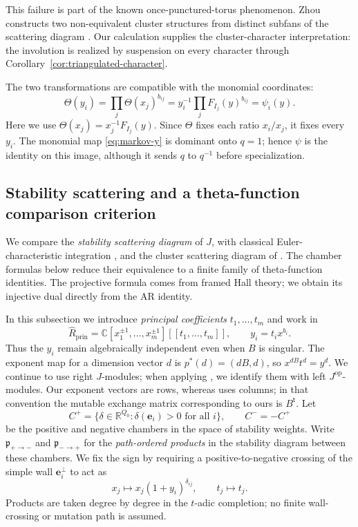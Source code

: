 \documentclass[11pt]{amsart}
\numberwithin{equation}{section}
\theoremstyle{definition}
\theoremstyle{remark}
\newcommand{\kk}{\mathbb C}
\newcommand{\RR}{\mathbb R}
\begin{document}
This failure is part of the known once-punctured-torus phenomenon. Zhou
constructs two non-equivalent cluster structures from distinct subfans of
the scattering diagram \cite[Section~5.3]{Zho20}. Our calculation supplies
the cluster-character interpretation: the involution is realized by
suspension on every character through Corollary~\ref{cor:triangulated-character}.

The two transformations are compatible with the monomial coordinates:
\[ \Theta(y_i)=\prod_j\Theta(x_j)^{b_{ij}}=y_i^{-1}\prod_jF_{I_j}(y)^{b_{ij}}=\psi_i(y). \]
Here we use $\Theta(x_j)=x_j^{-1}F_{I_j}(y)$. Since $\Theta$
fixes each ratio $x_i/x_j$, it fixes every $y_i$. The monomial
map \eqref{eq:markov-y} is dominant onto $q=1$; hence $\psi$
is the identity on this image, although it sends $q$ to $q^{-1}$
before specialization.

\subsection{Stability scattering and a theta-function comparison criterion}\label{subsec:chamber-products}
We compare the \emph{stability scattering diagram} of $J$, with
classical Euler-characteristic integration \cite{Bri17,CMQ24}, and the
cluster scattering diagram of \cite{GHKK18}. The chamber formulas below
reduce their equivalence to a finite family of theta-function identities.
The projective formula comes from framed Hall theory; we obtain its
injective dual directly from the AR identity.

In this subsection we introduce \emph{principal coefficients} $t_1,\ldots,t_m$ and work in
\[ \widehat R_{\mathrm{prin}}=\kk[x_1^{\pm1},\ldots,x_m^{\pm1}][[t_1,\ldots,t_m]],\qquad y_i=t_i x^{b_i}. \]
Thus the $y_i$ remain algebraically independent even when $B$ is
singular. The exponent map for a dimension vector $d$ is
$p^*(d)=(dB,d)$, so $x^{dB}t^d=y^d$. We continue to use right
$J$-modules; when applying \cite{CMQ24}, we identify them with left
$J^{\mathrm{op}}$-modules. Our exponent vectors are rows, whereas
\cite{CMQ24} uses columns; in that convention the mutable exchange
matrix corresponding to ours is $B^{\mathsf t}$.
Let
\[ C^+=\{\delta\in\RR^{Q_0}:\delta(\mathbf e_i)>0\text{ for all }i\},\qquad C^-=-C^+ \]
be the positive and negative chambers in the space of stability weights.
Write $\mathfrak p_{+\to-}$ and $\mathfrak p_{-\to+}$ for the
\emph{path-ordered products} in the stability diagram between these
chambers. We fix the sign by requiring a positive-to-negative crossing
of the simple wall $\mathbf e_i^\perp$ to act as
\[ x_j\longmapsto x_j(1+y_i)^{\delta_{ij}},\qquad t_j\longmapsto t_j. \]
Products are taken degree by degree in the $t$-adic completion;
no finite wall-crossing or mutation path is assumed.
\end{document}
